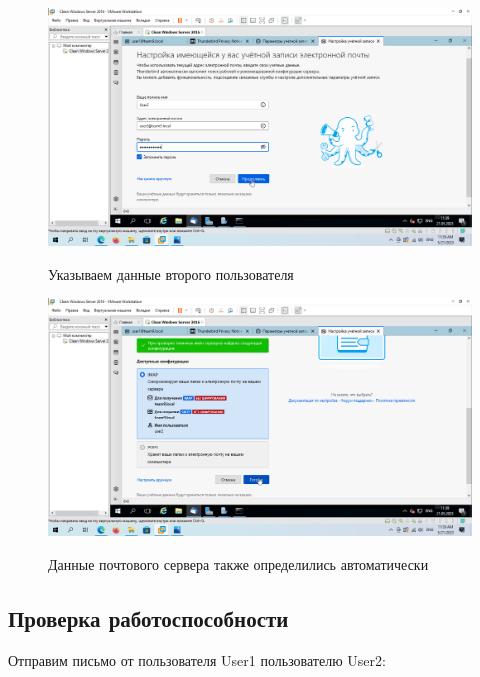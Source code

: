 \documentclass[a4paper]{article}
\begin{document}
  \begin{figure}[H]
    \centering
    \includegraphics[width=\textwidth]{11_0146}
    \label{img:146}
    \caption{Указываем данные второго пользователя}
  \end{figure}

  \begin{figure}[H]
    \centering
    \includegraphics[width=\textwidth]{11_0147}
    \label{img:147}
    \caption{Данные почтового сервера также определились автоматически}
  \end{figure}

  \subsection{Проверка работоспособности}

  Отправим письмо от пользователя User1 пользователю User2:
\end{document}
